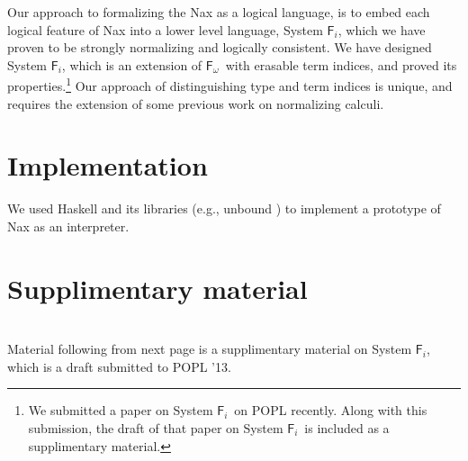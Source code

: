 \documentclass{llncs}
\newcommand{\eg}{{e.g.}}
\newcommand{\Fi}{\ensuremath{\mathsf{F}_i}}
\newcommand{\Fw}{\ensuremath{\mathsf{F}_\omega}}
\begin{document}
Our approach to formalizing the Nax as a logical language, is to
embed each logical feature of Nax into a lower level language,
System \Fi, which we have proven to
be strongly normalizing and logically consistent\cite{POPL13}. 
We have designed System \Fi, which is an extension of \Fw\ with 
erasable term indices, and proved its properties.\footnote{
	We submitted a paper on System \Fi\ on POPL recently.
	Along with this submission, the draft of that paper on System \Fi\ is
	included as a supplimentary material.}
Our approach of
distinguishing type and term indices is unique, and requires the
extension of some previous work on normalizing calculi. 
		
\section{Implementation}
We used Haskell and its libraries (\eg, unbound \cite{unbound})
to implement a prototype of Nax as an interpreter.






\newpage
\appendix
\section{Supplimentary material}
~\\

{\huge
Material following from next page is a supplimentary material on System \Fi,
which is a draft submitted to POPL '13.}
\end{document}
